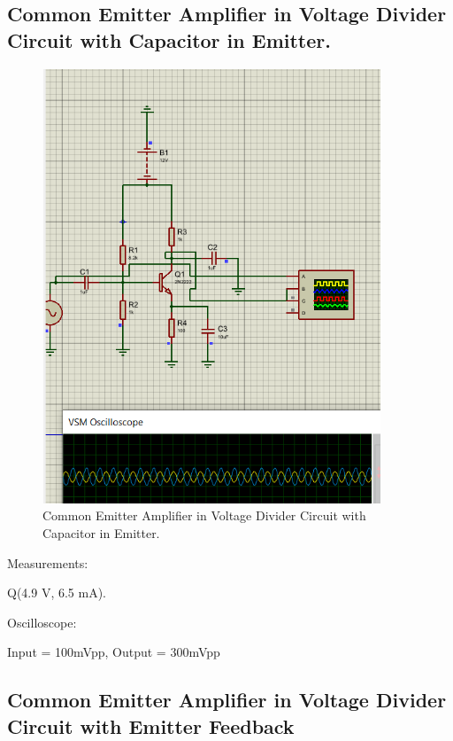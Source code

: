 \subsection{Common Emitter Amplifier in Voltage Divider Circuit with Capacitor in Emitter.}

\begin{figure}[H]
    \centering
    \includegraphics[width = 0.9\textwidth]{Imagenes/Imagenes_Santiago/5.PNG}
    \caption{Common Emitter Amplifier in Voltage Divider Circuit with Capacitor in Emitter.}
    \label{circuit1Ssimulated}
\end{figure}

Measurements:
\begin{center}
    Q(4.9 V, 6.5 mA).
    
\end{center}
Oscilloscope:

\begin{center}
    Input = 100mVpp, Output = 300mVpp
\end{center}

\newpage

\subsection{Common Emitter Amplifier in Voltage Divider Circuit with Emitter Feedback}

